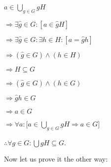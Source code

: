 \documentclass[12pt, a4paper]{article}
\begin{document}
\hspace{2mm} $a\in$\large{$\bigcup\limits_{g\in G}$}\normalsize$gH$\par
\vspace{2mm}
\hspace{10mm} $\Rightarrow\exists \hat{g}\in G\colon[a\in \hat{g}H]$\par
\vspace{2mm}
\hspace{10mm} $\Rightarrow\exists\hat{g}\in G\colon\exists h\in H\colon[a=\hat{g}h]$\par
\vspace{2mm}
\hspace{10mm} $\Rightarrow(\hat{g}\in G)\wedge(h\in H)$\par
\vspace{2mm}
\hspace{10mm} $\Rightarrow H\subseteq G$\par
\vspace{2mm}
\hspace{10mm} $\Rightarrow(\hat{g}\in G)\wedge(h\in G)$\par
\vspace{2mm}
\hspace{10mm} $\Rightarrow \hat{g}h\in G$\par
\vspace{2mm}
\hspace{10mm} $\Rightarrow a\in G$\par
\vspace{2mm}
\hspace{10mm} $\Rightarrow\forall a\colon [a\in$\large{$\bigcup\limits_{g\in G}$}\normalsize$gH\Rightarrow a\in G]$\par
\vspace{2mm}
\hspace{2mm} $\therefore\forall g\in G\colon$\large{$\bigcup$}\normalsize$gH\subseteq G$.\par

\newpage

\begin{flushleft}

    Now let us prove it the other way:

\end{flushleft}
    
\end{document}
